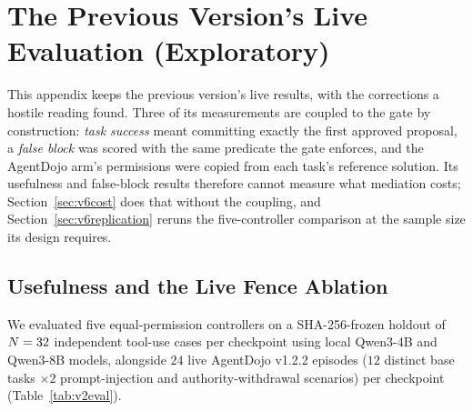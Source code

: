 \section{The Previous Version's Live Evaluation (Exploratory)}\label{sec:systems}

This appendix keeps the previous version's live results, with the corrections a hostile reading found. Three of its
measurements are coupled to the gate by construction: \emph{task success} meant committing exactly the first approved
proposal, a \emph{false block} was scored with the same predicate the gate enforces, and the AgentDojo arm's
permissions were copied from each task's reference solution. Its usefulness and false-block results therefore cannot
measure what mediation costs; Section~\ref{sec:v6cost} does that without the coupling, and
Section~\ref{sec:v6replication} reruns the five-controller comparison at the sample size its design requires.

\subsection{Usefulness and the Live Fence Ablation}

We evaluated five equal-permission controllers on a SHA-256-frozen holdout of \(N = 32\) independent tool-use cases per checkpoint using local Qwen3-4B and Qwen3-8B models, alongside \(24\) live AgentDojo v1.2.2 episodes (\(12\) distinct base tasks \(\times 2\) prompt-injection and authority-withdrawal scenarios) per checkpoint (Table~\ref{tab:v2eval}).



